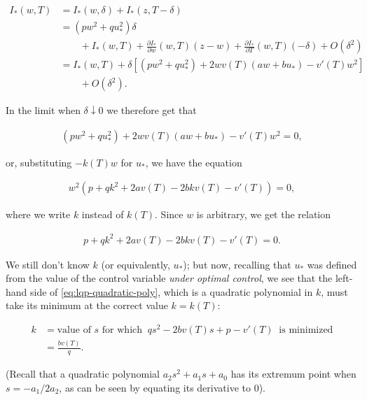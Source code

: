 \documentclass[11pt]{report}
\theoremstyle{plain}
\theoremstyle{definition}
\begin{document}
\begin{align*}
I_*(w,T) &= I_*(w,\delta) + I_*(z,T-\delta) \\
&= (p w^2 + q u_*^2)\delta \\ & \qquad +
I_*(w,T) + \frac{\partial I_*}{\partial w}(w,T)(z-w) + \frac{\partial I_*}{\partial T}(w,T)(-\delta) + O(\delta^2) \\
&=
I_*(w,T) + \delta\left[
(p w^2+qu_*^2) + 2w v(T)(aw+b u_*) - v'(T) w^2
\right] \\
& \qquad + O(\delta^2).
\end{align*}

\noindent In the limit when $\delta\downarrow 0$ we therefore
get that

\begin{align*}
(p w^2+qu_*^2) + 2w v(T)(aw+b u_*) - v'(T) w^2 = 0,
\end{align*}

\noindent or, substituting $-k(T)w$ for $u_*$, we have the
equation

\begin{align*}
w^2\left(
p + q k^2 + 2av(T) -2 b k v(T) -v'(T)
\right) = 0,
\end{align*}

\noindent where we write $k$ instead of $k(T)$. Since $w$ is
arbitrary, we get the relation

\begin{equation*} \tag{50}\label{eq:lqp-quadratic-poly}
\begin{split}
p + q k^2 + 2av(T) -2 b k v(T) -v'(T) = 0.
\end{split}
\end{equation*}

\noindent We still don't know $k$ (or equivalently, $u_*$); but
now, recalling that $u_*$ was defined from the value
of the control variable \emph{under optimal control}, we
see that the left-hand side of
\eqref{eq:lqp-quadratic-poly}, which is a quadratic
polynomial in $k$, must take its minimum at the
correct value $k=k(T)$:

\begin{align*}
k &= \textrm{value of $s$ for which }\  qs^2-2b v(T) s + p-v'(T)\ \textrm{ is minimized} \\
&= \frac{b v(T)}{q}.
\end{align*}

\noindent (Recall that a quadratic polynomial $a_2s^2+a_1s+a_0$
has its extremum point when $s=-a_1/2a_2$, as can be
seen by equating its derivative to $0$).
\end{document}
